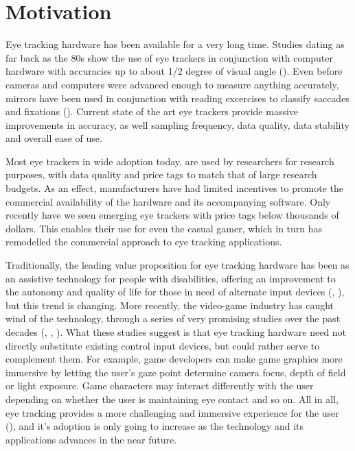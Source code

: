 \section{Motivation} \label{sec:intro_motivation}

Eye tracking hardware has been available for a very long time. Studies dating as far back as the 80s show the use of eye trackers in conjunction with computer hardware with accuracies up to about 1/2 degree of visual angle (\cite{colin1986}). Even before cameras and computers were advanced enough to measure anything accurately, mirrors have been used in conjunction with reading excercises to classify saccades and fixations (\cite{vanGog2013}). Current state of the art eye trackers provide massive improvements in accuracy, as well sampling frequency, data quality, data stability and overall ease of use.

Most eye trackers in wide adoption today, are used by researchers for research purposes, with data quality and price tags to match that of large research budgets. As an effect, manufacturers have had limited incentives to promote the commercial availability of the hardware and its accompanying software. Only recently have we seen emerging eye trackers with price tags below thousands of dollars. This enables their use for even the casual gamer, which in turn has remodelled the commercial approach to eye tracking applications.

Traditionally, the leading value proposition for eye tracking hardware has been as an assistive technology for people with disabilities, offering an improvement to the autonomy and quality of life for those in need of alternate input devices (\cite{barry1994}, \cite{corno2002}), but this trend is changing. More recently, the video-game industry has caught wind of the technology, through a series of very promising studies over the past decades (\cite{leyba2004}, \cite{smith2006}, \cite{tobii2017}). What these studies suggest is that eye tracking hardware need not directly substitute existing control input devices, but could rather serve to complement them. For example, game developers can make game graphics more immersive by letting the user's gaze point determine camera focus, depth of field or light exposure. Game characters may interact differently with the user depending on whether the user is maintaining eye contact and so on. All in all, eye tracking provides a more challenging and immersive experience for the user (\cite{antunes2018}), and it's adoption is only going to increase as the technology and its applications advances in the near future.

